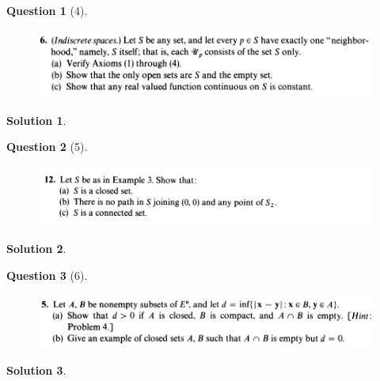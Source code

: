 \documentclass{article} %
\theoremstyle{quest}
\newtheorem*{question}{Question}
\newtheorem*{solution}{Solution}
\begin{document}
\newpage

\begin{question}[4]
\hfill
\begin{figure}[h!]
  \centering
    \includegraphics[width=1\textwidth]{MA-2-26-6.png}
\end{figure}
\end{question}
\begin{solution}
  
\end{solution}

\newpage

\begin{question}[5]
\hfill
\begin{figure}[h!]
  \centering
    \includegraphics[width=1\textwidth]{MA-2-27-12.png}
\end{figure}
\end{question}
\begin{solution} 
 
 
\end{solution}

\newpage

\begin{question}[6]
\hfill
\begin{figure}[h!]
  \centering
    \includegraphics[width=1\textwidth]{MA-2-28-5.png}
\end{figure}
\end{question}
\begin{solution} 
 
 
\end{solution}
\newpage
\end{document}
